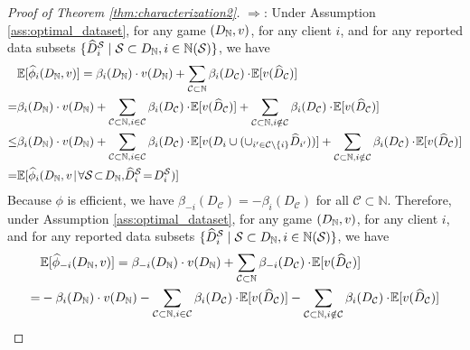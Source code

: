 \begin{proof}[Proof of Theorem \ref{thm:characterization2}]
	$\Rightarrow$: Under Assumption \ref{ass:optimal_dataset}, for any game $(D_{\mathbb{N}}, v)$, for any client $i$, and for any reported data subsets $\{\widehat{D}^{\mathcal{S}}_{i}\mid \mathcal{S} \subset D_{\mathbb{N}}, i \in \mathbb{N}(\mathcal{S}) \}$, we have
	\begin{align*}
		&\mathbb{E}[\empiricaldatavalue_{i}(\granddataset, v)] = \beta_i(\granddataset) \cdot v(\granddataset) +\sum_{\mathcal{C}\subset \mathbb{N}} \beta_i(D_{\mathcal{C}}) \cdot\! \mathbb{E}[v(\widehat{D}_{\mathcal{C}})]\\
		= & \beta_i(\granddataset) \cdot v(\granddataset) +\sum_{\mathcal{C}\subset \mathbb{N}, i\in \mathcal{C}} \beta_i(D_{\mathcal{C}}) \cdot\! \mathbb{E}[v(\widehat{D}_{\mathcal{C}})] +\sum_{\mathcal{C}\subset \mathbb{N}, i\notin \mathcal{C}} \beta_i(D_{\mathcal{C}}) \cdot\! \mathbb{E}[v(\widehat{D}_{\mathcal{C}})] \\
		\leq & \beta_i(\granddataset) \cdot v(\granddataset) +\sum_{\mathcal{C}\subset \mathbb{N}, i\in \mathcal{C}} \beta_i(D_{\mathcal{C}}) \cdot\! \mathbb{E}[v(D_i \cup (\cup_{i'\in \mathcal{C} \setminus \{i\}} \widehat{D}_{i'}))] +\sum_{\mathcal{C}\subset \mathbb{N}, i\notin \mathcal{C}} \beta_i(D_{\mathcal{C}}) \cdot\! \mathbb{E}[v(\widehat{D}_{\mathcal{C}})]\\
		= & \mathbb{E}[\empiricaldatavalue_{i}(\granddataset, v \!\mid\! \forall \datasubset \!\subset \!\granddataset,\! \reportedstoi\! =  \!\stoi)]
	\end{align*}
	Because $\phi$ is efficient, we have $\beta_{-i}(D_{\mathcal{C}}) = - \beta_{i}(D_{\mathcal{C}})$ for all $\mathcal{C} \subset \mathbb{N}$.
	Therefore, under Assumption \ref{ass:optimal_dataset}, for any game $(D_{\mathbb{N}}, v)$, for any client $i$, and for any reported data subsets $\{\widehat{D}^{\mathcal{S}}_{i}\mid \mathcal{S} \subset D_{\mathbb{N}}, i \in \mathbb{N}(\mathcal{S}) \}$, we have
	\begin{align*}
		&\mathbb{E}[\empiricaldatavalue_{-i}(\granddataset, v)] = \beta_{-i}(\granddataset) \cdot v(\granddataset) +\sum_{\mathcal{C}\subset \mathbb{N}} \beta_{-i}(D_{\mathcal{C}}) \cdot\! \mathbb{E}[v(\widehat{D}_{\mathcal{C}})]\\
		= & -\beta_i(\granddataset) \cdot v(\granddataset) -\sum_{\mathcal{C}\subset \mathbb{N}, i\in \mathcal{C}} \beta_i(D_{\mathcal{C}}) \cdot\! \mathbb{E}[v(\widehat{D}_{\mathcal{C}})] -\sum_{\mathcal{C}\subset \mathbb{N}, i\notin \mathcal{C}} \beta_i(D_{\mathcal{C}}) \cdot\! \mathbb{E}[v(\widehat{D}_{\mathcal{C}})] \\

\end{align*}
\end{proof}
